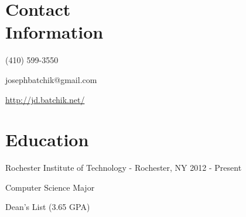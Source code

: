 \documentclass[a4paper,margin,line,11pt]{resume}
\newcommand{\rurl}[1]{\hfill {\footnotesize \url{#1}}}
\newcommand{\rdate}[1]{\hfill {\small #1}}
\begin{document}
\begin{resume}
\section{\mysidestyle Contact \\ Information} \vspace{2mm}
	\begin{asparablank}
		\item \hfill (410) 599-3550
		\item \hfill josephbatchik@gmail.com
		\item \rurl{http://jd.batchik.net/}
	\end{asparablank}

\section{\mysidestyle Education}
	\begin{compactdesc}
		\item[Rochester Institute of Technology] - Rochester, NY \rdate{2012 - Present}
		\begin{compactitem} { \small
			\item Computer Science Major
			\item Dean's List (3.65 GPA)
		} \end{compactitem}
	\end{compactdesc}


\end{resume}
\end{document}
